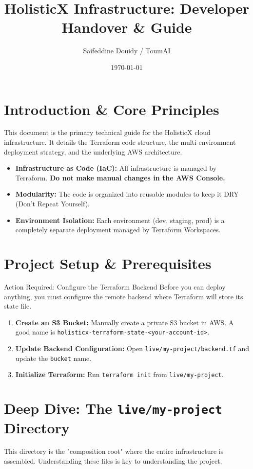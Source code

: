 \documentclass[a4paper,11pt]{article}
\title{\textbf{HolisticX Infrastructure: Developer Handover \& Guide}}
\author{Saifeddine Douidy / ToumAI}
\date{\today}
\begin{document}
\maketitle
\thispagestyle{empty}
\tableofcontents
\newpage

\section{Introduction \& Core Principles}
This document is the primary technical guide for the HolisticX cloud infrastructure. It details the Terraform code structure, the multi-environment deployment strategy, and the underlying AWS architecture.

\begin{itemize}
    \item \textbf{Infrastructure as Code (IaC):} All infrastructure is managed by Terraform. \textbf{Do not make manual changes in the AWS Console.}
    \item \textbf{Modularity:} The code is organized into reusable modules to keep it DRY (Don't Repeat Yourself).
    \item \textbf{Environment Isolation:} Each environment (dev, staging, prod) is a completely separate deployment managed by Terraform Workspaces.
\end{itemize}

\section{Project Setup \& Prerequisites}
\begin{guidebox}{Action Required: Configure the Terraform Backend}
Before you can deploy anything, you must configure the remote backend where Terraform will store its state file.
\begin{enumerate}
    \item \textbf{Create an S3 Bucket:} Manually create a private S3 bucket in AWS. A good name is \texttt{holisticx-terraform-state-<your-account-id>}.
    \item \textbf{Update Backend Configuration:} Open \texttt{live/my-project/backend.tf} and update the \texttt{bucket} name.
    \item \textbf{Initialize Terraform:} Run \texttt{terraform init} from \texttt{live/my-project}.
\end{enumerate}
\end{guidebox}

\section{Deep Dive: The \texttt{live/my-project} Directory}
This directory is the "composition root" where the entire infrastructure is assembled. Understanding these files is key to understanding the project.
\end{document}
